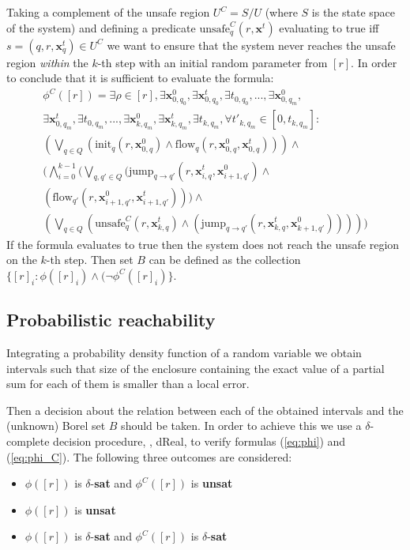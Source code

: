 Taking a complement of the unsafe region $U^{C} = S / U$ (where $S$ is the state space of the 
system) and defining a predicate $\text{unsafe}^{C}_{q}(r,\textbf{x}^{t})$ evaluating to true iff
$s = (q, r, \textbf{x}^{t}_{q}) \in U^{C}$ we want to ensure that the system never reaches the 
unsafe region {\em within} the $k$-th step with an initial random parameter from $[r]$. 
In order to conclude that it is sufficient to evaluate the formula:
\begin{equation} \label{eq:phi_C}
\begin{split}
\phi^{C}([r]) = 
	\exists \rho \in [r], \exists \textbf{x}^{0}_{0,q_0}, \exists \textbf{x}^{t}_{0,q_0}, \exists t_{0, q_0} , ... , \exists \textbf{x}^{0}_{0,q_m}, \\
\exists \textbf{x}^{t}_{0,q_m}, \exists t_{0, q_m}, ... , \exists \textbf{x}^{0}_{k,q_m}, \exists \textbf{x}^t_{k,q_m}, \exists t_{k, q_m}, \forall t'_{k, q_m} \in [0, t_{k, q_m}]:\\
(\bigvee_{q \in Q} (\text{init}_{q}(r, \textbf{x}^{0}_{0,q}) \wedge \text{flow}_{q}(r, \textbf{x}^{0}_{0,q}, \textbf{x}^{t}_{0,q}))) \wedge \\
(\bigwedge_{i=0}^{k-1} (\bigvee_{q,q' \in Q}(\text{jump}_{q \rightarrow q'}(r, \textbf{x}^{t}_{i,q}, \textbf{x}^{0}_{i+1,q'}) 
\wedge \\
(\text{flow}_{q'}(r, \textbf{x}^{0}_{i+1,q'}, \textbf{x}^{t}_{i+1,q'}))) \wedge \\
(\bigvee_{q \in Q} (\text{unsafe}^{C}_{q}(r, \textbf{x}^{t}_{k,q}) \wedge (\text{jump}_{q \rightarrow q'}(r, \textbf{x}^{t}_{k,q}, \textbf{x}^{0}_{k+1,q'})))))
\end{split}
\end{equation}
If the formula evaluates to true then the system does not reach the unsafe region on the $k$-th step.
Then set $B$ can be defined as the collection
$\{[r]_{i} : \phi([r]_{i}) \wedge (\neg \phi^{C}([r]_{i})\}$.

\subsection{Probabilistic reachability}
Integrating a probability density function of a random variable we obtain intervals 
such that size of the enclosure containing the exact value of a partial sum for each 
of them is smaller than a local error.

Then a decision about the relation between each of the obtained intervals and the (unknown) 
Borel set $B$ should be taken. In order to achieve this we use a $\delta$-complete decision 
procedure, \ie, dReal, to verify formulas (\ref{eq:phi}) and (\ref{eq:phi_C}). The following 
three outcomes are considered:
\begin{itemize}
	\item{$\phi([r])$ is $\delta$-\textbf{sat} and $\phi^C([r])$ is \textbf{unsat}}
	\item{$\phi([r])$ is \textbf{unsat}}
	\item{$\phi([r])$ is $\delta$-\textbf{sat} and $\phi^C([r])$ is $\delta$-\textbf{sat}}
\end{itemize}


